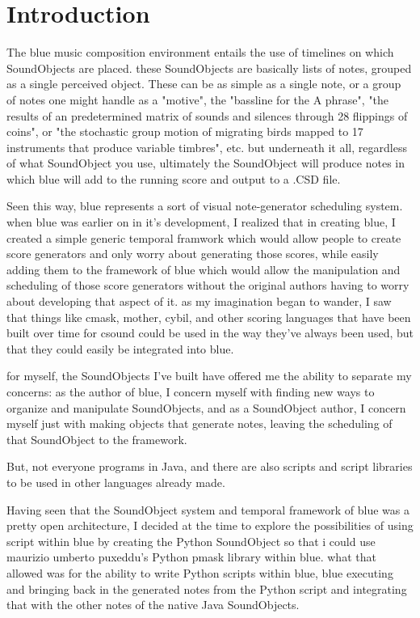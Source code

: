 \section{Introduction}

The blue music composition environment entails the use of timelines on
which SoundObjects are placed. these SoundObjects are basically lists of
notes, grouped as a single perceived object. These can be as simple as a
single note, or a group of notes one might handle as a "motive", the
"bassline for the A phrase", "the results of an predetermined matrix of
sounds and silences through 28 flippings of coins", or "the stochastic
group motion of migrating birds mapped to 17 instruments that produce
variable timbres", etc. but underneath it all, regardless of what
SoundObject you use, ultimately the SoundObject will produce notes in
which blue will add to the running score and output to a .CSD file.

Seen this way, blue represents a sort of visual note-generator
scheduling system. when blue was earlier on in it's development, I
realized that in creating blue, I created a simple generic temporal
framwork which would allow people to create score generators and only
worry about generating those scores, while easily adding them to the
framework of blue which would allow the manipulation and scheduling of
those score generators without the original authors having to worry
about developing that aspect of it. as my imagination began to wander, I
saw that things like cmask, mother, cybil, and other scoring languages
that have been built over time for csound could be used in the way
they've always been used, but that they could easily be integrated into
blue.

for myself, the SoundObjects I've built have offered me the ability to
separate my concerns: as the author of blue, I concern myself with
finding new ways to organize and manipulate SoundObjects, and as a
SoundObject author, I concern myself just with making objects that
generate notes, leaving the scheduling of that SoundObject to the
framework.

But, not everyone programs in Java, and there are also scripts and
script libraries to be used in other languages already made.

Having seen that the SoundObject system and temporal framework of blue
was a pretty open architecture, I decided at the time to explore the
possibilities of using script within blue by creating the Python
SoundObject so that i could use maurizio umberto puxeddu's Python pmask
library within blue. what that allowed was for the ability to write
Python scripts within blue, blue executing and bringing back in the
generated notes from the Python script and integrating that with the
other notes of the native Java SoundObjects.

